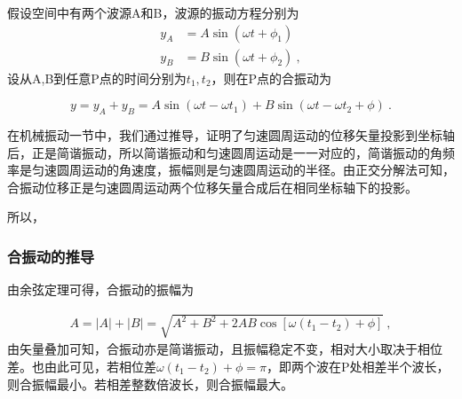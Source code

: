 假设空间中有两个波源A和B，波源的振动方程分别为
\begin{equation}
\begin{aligned}
y_A&=A\sin(\omega t+\phi_1)\\
y_B&=B\sin (\omega t+\phi_2)~,
\end{aligned}
\end{equation}
设从A,B到任意P点的时间分别为$t_1,t_2$，则在P点的合振动为

\begin{equation}
y=y_A+y_B=A\sin(\omega t-\omega t_1)+B\sin(\omega t-\omega t_2+\phi)~.
\end{equation}

在机械振动一节中，我们通过推导，证明了匀速圆周运动的位移矢量投影到坐标轴后，正是简谐振动，所以简谐振动和匀速圆周运动是一一对应的，简谐振动的角频率是匀速圆周运动的角速度，振幅则是匀速圆周运动的半径。由正交分解法可知，合振动位移正是匀速圆周运动两个位移矢量合成后在相同坐标轴下的投影。

所以，
\subsubsection{合振动的推导}
由余弦定理可得，合振动的振幅为

\begin{equation}
\begin{aligned}
A=|A|+|B|=\sqrt{A^2+B^2+2AB\cos[\omega(t_1-t_2)+\phi]}~,
\end{aligned}
\end{equation}
由矢量叠加可知，合振动亦是简谐振动，且振幅稳定不变，相对大小取决于相位差。也由此可见，若相位差$\omega(t_1-t_2)+\phi=\pi$，即两个波在P处相差半个波长，则合振幅最小。若相差整数倍波长，则合振幅最大。